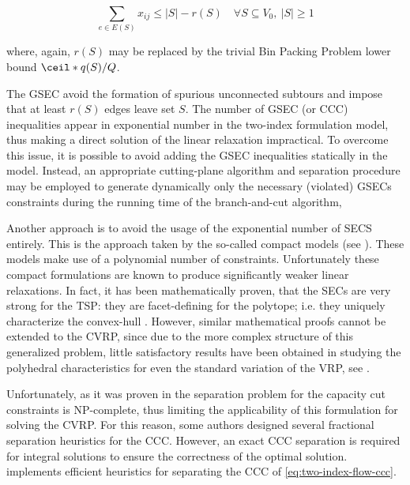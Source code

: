 \begin{equation}\label{eq:cvrp-2flow-gsec}
	\sum_{e \in E(S)} x_{ij} \le |S| - r(S) \quad \forall S \subseteq V_0,\ |S| \ge 1
\end{equation}

where, again, $r(S)$ may be replaced by the trivial Bin Packing Problem lower bound $\ceil*{q(S) / Q}$.

The GSEC avoid the formation of spurious unconnected subtours and impose that at least $r(S)$ edges leave set $S$.
The number of GSEC (or CCC) inequalities appear in exponential number in the two-index formulation model,
thus making a direct solution of the linear relaxation impractical.
To overcome this issue, it is possible to avoid adding the GSEC inequalities statically in the model.
Instead, an appropriate cutting-plane algorithm and separation procedure may be employed to generate dynamically
only the necessary (violated) GSECs constraints
during the running time of the branch-and-cut algorithm,

Another approach is to avoid the usage of the exponential number of SECS entirely.
This is the approach taken by the so-called compact models (see \cite{miller1960, christofides1979, desrochers1991}).
These models make use of a polynomial number of constraints.
Unfortunately these compact formulations are known to produce significantly weaker linear relaxations.
In fact, it has been mathematically proven,
that the SECs are very strong for the TSP: they are facet-defining for the polytope;
i.e. they uniquely characterize the convex-hull \parencite{grotschel1975}.
However, similar mathematical proofs cannot be extended to the CVRP,
since due to the more complex structure of this generalized problem,
little satisfactory results have been obtained in studying the polyhedral characteristics
for even the standard variation of the VRP, see \textcite{campos1991, cornuejols1993}.

Unfortunately, as it was proven in \textcite{augerat1995} the separation problem
for the capacity cut constraints is NP-complete, thus limiting the applicability
of this formulation for solving the CVRP.
For this reason, some authors \parencite{augerat1995, augerat1998, ralphs2003} designed
several fractional separation heuristics for the CCC.
However,
an exact CCC separation is required for integral solutions
to ensure the correctness of the optimal solution.
\textcite{lysgaard2003cvrpsep} implements efficient
heuristics for separating the CCC of \cref{eq:two-index-flow-ccc}.


